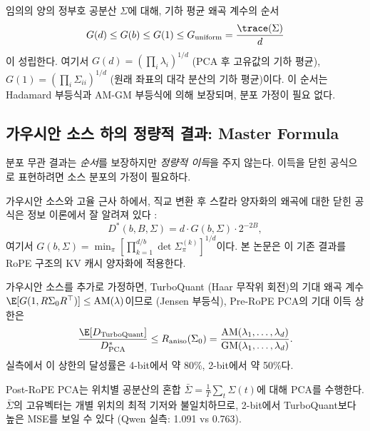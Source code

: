 \begin{corollary}[블록 크기 계층 --- 분포 무관]
\label{cor:block_hierarchy}
임의의 양의 정부호 공분산 $\Sigma$에 대해, 기하 평균 왜곡 계수의 순서
\begin{equation}
G(d) \leq G(b) \leq G(1) \leq G_{\mathrm{uniform}} = \frac{\trace(\Sigma)}{d}
\end{equation}
이 성립한다. 여기서 $G(d) = (\prod_i \lambda_i)^{1/d}$ (PCA 후 고유값의 기하 평균), $G(1) = (\prod_i \Sigma_{ii})^{1/d}$ (원래 좌표의 대각 분산의 기하 평균)이다. 이 순서는 Hadamard 부등식과 AM-GM 부등식에 의해 보장되며, 분포 가정이 필요 없다.
\end{corollary}

\subsection{가우시안 소스 하의 정량적 결과: Master Formula}

분포 무관 결과는 \emph{순서}를 보장하지만 \emph{정량적 이득}을 주지 않는다. 이득을 닫힌 공식으로 표현하려면 소스 분포의 가정이 필요하다.

가우시안 소스와 고율 근사 하에서, 직교 변환 후 스칼라 양자화의 왜곡에 대한 닫힌 공식은 정보 이론에서 잘 알려져 있다 \citep{goyal2001transform,cover2006elements}:
\begin{equation}
D^*(b, B, \Sigma) = d \cdot G(b, \Sigma) \cdot 2^{-2B},
\label{eq:master_formula}
\end{equation}
여기서 $G(b, \Sigma) = \min_\pi [\prod_{k=1}^{d/b} \det \Sigma^{(k)}_\pi]^{1/d}$이다. 본 논문은 이 기존 결과를 RoPE 구조의 KV 캐시 양자화에 적용한다.

\begin{corollary}
\label{cor:gain_over_turbo}
가우시안 소스를 추가로 가정하면, TurboQuant (Haar 무작위 회전)의 기대 왜곡 계수 $\E[G(1, R\Sigma_0 R^\top)] \leq \mathrm{AM}(\lambda)$이므로 (Jensen 부등식), Pre-RoPE PCA의 기대 이득 상한은
\begin{equation}
\frac{\E[D_{\mathrm{TurboQuant}}]}{D^*_{\mathrm{PCA}}} \leq R_{\mathrm{aniso}}(\Sigma_0) = \frac{\mathrm{AM}(\lambda_1, \ldots, \lambda_d)}{\mathrm{GM}(\lambda_1, \ldots, \lambda_d)}.
\end{equation}
실측에서 이 상한의 달성률은 4-bit에서 약 80\%, 2-bit에서 약 50\%다.
\end{corollary}

\begin{remark}
\label{rem:post_rope_fails}
Post-RoPE PCA는 위치별 공분산의 혼합 $\bar{\Sigma} = \frac{1}{T}\sum_t \Sigma(t)$에 대해 PCA를 수행한다. $\bar{\Sigma}$의 고유벡터는 개별 위치의 최적 기저와 불일치하므로, 2-bit에서 TurboQuant보다 높은 MSE를 보일 수 있다 (Qwen 실측: 1.091 vs 0.763).
\end{remark}

